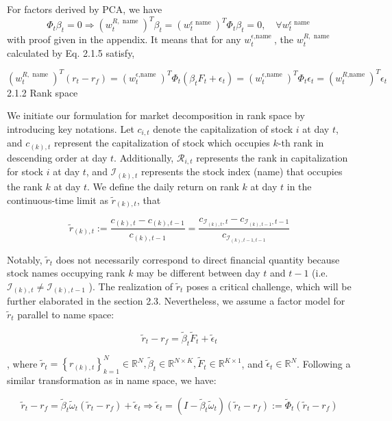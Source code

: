 \documentclass[12pt,article]{memoir}
\begin{document}
For factors derived by PCA, we have
$$
\Phi_t \beta_t=0 \Longrightarrow\left(w_t^{R, \text { name }}\right)^T \beta_t=\left(w_t^{\epsilon \text { name }}\right)^T \Phi_t \beta_t=0, \quad \forall w_t^{\epsilon \text { name }}
$$
with proof given in the appendix. It means that for any $w_t^{\epsilon \text {,name }}$, the $w_t^{R, \text { name }}$ calculated by Eq. 2.1.5 satisfy,

$$
\left(w_t^{R, \text { name }}\right)^T\left(r_t-r_f\right)=\left(w_t^{\epsilon \text {,name }}\right)^T \Phi_t\left(\beta_t F_t+\epsilon_t\right)=\left(w_t^{\epsilon \text {,name }}\right)^T \Phi_t \epsilon_t=\left(w_t^{R \text {,name }}\right)^T \epsilon_t
$$
2.1.2 Rank space

We initiate our formulation for market decomposition in rank space by introducing key notations. Let $c_{i, t}$ denote the capitalization of stock $i$ at day $t$, and $c_{(k), t}$ represent the capitalization of stock which occupies $k$-th rank in descending order at day $t$. Additionally, $\mathcal{R}_{i, t}$ represents the rank in capitalization for stock $i$ at day $t$, and $\mathcal{I}_{(k), t}$ represents the stock index (name) that occupies the rank $k$ at day $t$. We define the daily return on rank $k$ at day $t$ in the continuous-time limit as $\tilde{r}_{(k), t}$, that

$$
\tilde{r}_{(k), t}:=\frac{c_{(k), t}-c_{(k), t-1}}{c_{(k), t-1}}=\frac{c_{\mathcal{I}_{(k), t}, t}-c_{\mathcal{I}_{(k), t-1}, t-1}}{c_{\mathcal{I}_{(k), t-1, t-1}}}
$$


Notably, $\tilde{r}_t$ does not necessarily correspond to direct financial quantity because stock names occupying rank $k$ may be different between day $t$ and $t-1$ (i.e. $\mathcal{I}_{(k), t} \neq \mathcal{I}_{(k), t-1}$ ). The realization of $\tilde{r}_t$ poses a critical challenge, which will be further elaborated in the section 2.3. Nevertheless, we assume a factor model for $\tilde{r}_t$ parallel to name space:

$$
\tilde{r}_t-r_f=\tilde{\beta}_t \tilde{F}_t+\tilde{\epsilon}_t
$$

, where $\tilde{r}_t=\left\{r_{(k), t}\right\}_{k=1}^N \in \mathbb{R}^N, \tilde{\beta}_t \in \mathbb{R}^{N \times K}, \tilde{F}_t \in \mathbb{R}^{K \times 1}$, and $\tilde{\epsilon}_t \in \mathbb{R}^N$. Following a similar transformation as in name space, we have:

$$
\tilde{r}_t-r_f=\tilde{\beta}_t \tilde{\omega}_t\left(\tilde{r}_t-r_f\right)+\tilde{\epsilon}_t \Rightarrow \tilde{\epsilon}_t=\left(I-\tilde{\beta}_t \tilde{\omega}_t\right)\left(\tilde{r}_t-r_f\right):=\tilde{\Phi}_t\left(\tilde{r}_t-r_f\right)
$$
\end{document}
